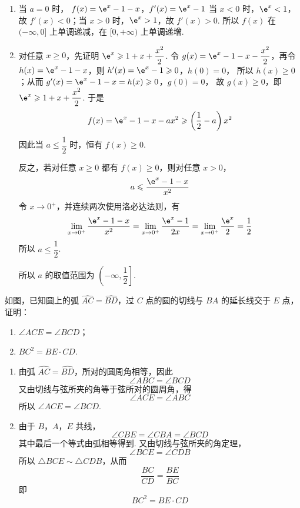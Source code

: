 \begin{solution}
\begin{enumerate}
\item 当 \(a=0\) 时，
\(f(x)=\e^x-1-x\)，\(f'(x)=\e^x-1\)
当 \(x<0\) 时，\(\e^x<1\)，故 \(f'(x)<0\)；当 \(x>0\) 时，\(\e^x>1\)，故 \(f'(x)>0\). 所以 \(f(x)\) 在 \((-\infty,0]\) 上单调递减，在 \([0,+\infty)\) 上单调递增.

\item 对任意 \(x\geqslant0\)，先证明 \(\e^x\geqslant1+x+\dfrac{x^2}{2}\).
令 \(g(x)=\e^x-1-x-\dfrac{x^2}{2}\)，再令 \(h(x)=\e^x-1-x\)，则
\(h'(x)=\e^x-1\geqslant0\)，\(h(0)=0\)，
所以 \(h(x)\geqslant0\)；从而
\(g'(x)=\e^x-1-x=h(x)\geqslant0\)，\(g(0)=0\)，
故 \(g(x)\geqslant0\)，即 \(\e^x\geqslant1+x+\dfrac{x^2}{2}\). 于是
\[
f(x)=\e^x-1-x-ax^2\geqslant\left(\frac12-a\right)x^2
\]
因此当 \(a\leqslant\dfrac12\) 时，恒有 \(f(x)\geqslant0\).

反之，若对任意 \(x\geqslant0\) 都有 \(f(x)\geqslant0\)，则对任意 \(x>0\)，
\[
a\leqslant\frac{\e^x-1-x}{x^2}
\]
令 \(x\to0^+\)，并连续两次使用洛必达法则，有
\[
\lim_{x\to0^+}\frac{\e^x-1-x}{x^2}
=\lim_{x\to0^+}\frac{\e^x-1}{2x}
=\lim_{x\to0^+}\frac{\e^x}{2}
=\frac12
\]
所以 \(a\leqslant\dfrac12\).

所以 \(a\) 的取值范围为 \(\left(-\infty,\dfrac12\right]\).
\end{enumerate}
\end{solution}

\begin{problem}
如图，已知圆上的弧 \(\widehat{AC} = \widehat{BD}\)，过 \(C\) 点的圆的切线与 \(BA\) 的延长线交于 \(E\) 点，证明：

\begin{enumerate}
\item \(\angle ACE = \angle BCD\)；
\item \(BC^{2} = BE\cdot CD\).
\end{enumerate}


\end{problem}

\begin{solution}
\begin{enumerate}
\item
由弧 \(\widehat{AC}=\widehat{BD}\)，所对的圆周角相等，因此
\[
\angle ABC=\angle BCD
\]
又由切线与弦所夹的角等于弦所对的圆周角，得
\[
\angle ACE=\angle ABC
\]
所以 \(\angle ACE=\angle BCD\).

\item
由于 \(B\)，\(A\)，\(E\) 共线，
\[
\angle CBE=\angle CBA=\angle BCD
\]
其中最后一个等式由弧相等得到. 又由切线与弦所夹的角定理，
\[
\angle BCE=\angle CDB
\]
所以 \(\triangle BCE\sim\triangle CDB\)，从而
\[
\frac{BC}{CD}=\frac{BE}{BC}
\]
即
\[
BC^2=BE\cdot CD
\]
\end{enumerate}
\end{solution}


